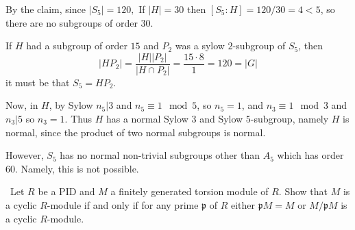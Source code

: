 \documentclass[12pt]{AlgebraQual}
\begin{document}
\begin{solution}
By the claim, since $|S_5|=120,$ If $|H|=30$ then $[S_5:H]=120/30=4<5$, so there are no subgroups of order $30$.

If $H$ had a subgroup of order $15$ and $P_2$ was a sylow $2$-subgroup of $S_5$, then $$|HP_2|=\frac{|H||P_2|}{|H\cap P_2|}=\frac{15\cdot 8}{1}=120=|G|$$ it must be that $S_5=HP_2$.

Now, in $H$, by Sylow $n_5|3$ and $n_5\equiv 1\mod 5$, so $n_5=1$, and $n_3\equiv 1\mod 3$ and $n_3|5$ so $n_3=1.$ Thus $H$ has a normal Sylow $3$ and Sylow $5$-subgroup, namely $H$ is normal, since the product of two normal subgroups is normal.

However, $S_5$ has no normal non-trivial subgroups other than $A_5$ which has order $60$. Namely, this is not possible.
\end{solution}
\newpage


\begin{problem} $\,$
Let $R$ be a PID and $M$ a finitely generated torsion module of $R.$ Show that $M$ is a cyclic $R$-module if and only if for any prime $\mathfrak{p}$ of $R$ either $\mathfrak{p}M=M$ or $M/\mathfrak{p}M$ is a cyclic $R$-module.
\end{problem}
\end{document}
